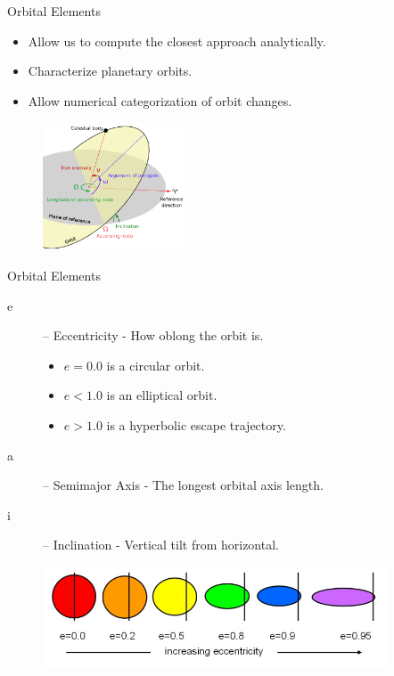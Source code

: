 \documentclass{beamer}
\begin{document}
\begin{frame}{Orbital Elements}
    \begin{itemize}
        \item Allow us to compute the closest approach analytically.
        \item Characterize planetary orbits.
        \item Allow numerical categorization of orbit changes.
    \end{itemize}
    \begin{figure}
        \centering
        \includegraphics[height=1.5in]{orbital_elems}
    \end{figure}

\end{frame}

\begin{frame}{Orbital Elements}
    \begin{description}
        \item[e] -- Eccentricity - How oblong the orbit is.
            \begin{itemize}
                \item $e = 0.0$ is a circular orbit.
                \item $e < 1.0$ is an elliptical orbit.
                \item $e > 1.0$ is a hyperbolic escape trajectory.
            \end{itemize}
        \item[a] -- Semimajor Axis - The longest orbital axis length.
        \item[i] -- Inclination - Vertical tilt from horizontal.
    \end{description}
    \begin{figure}
        \centering
        \includegraphics[height=1.2in]{eccentricity}
    \end{figure}
\end{frame}
\end{document}
